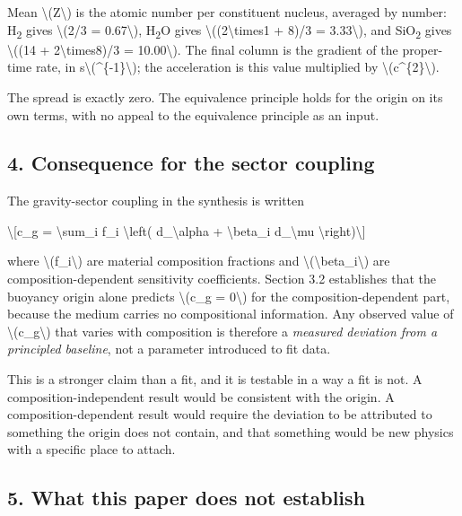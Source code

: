 \documentclass[
  10pt,
]{article}
\begin{document}
Mean \textbackslash(Z\textbackslash) is the atomic number per
constituent nucleus, averaged by number: H\textsubscript{2} gives
\textbackslash(2/3 = 0.67\textbackslash), H\textsubscript{2}O gives
\textbackslash((2\textbackslash times1 + 8)/3 = 3.33\textbackslash), and
SiO\textsubscript{2} gives \textbackslash((14 +
2\textbackslash times8)/3 = 10.00\textbackslash). The final column is
the gradient of the proper-time rate, in
s\textbackslash(\^{}\{-1\}\textbackslash); the acceleration is this
value multiplied by \textbackslash(c\^{}\{2\}\textbackslash).

The spread is exactly zero. The equivalence principle holds for the
origin on its own terms, with no appeal to the equivalence principle as
an input.

\hypertarget{consequence-for-the-sector-coupling}{%
\subsection{4. Consequence for the sector
coupling}\label{consequence-for-the-sector-coupling}}

The gravity-sector coupling in the synthesis is written

\textbackslash{[}c\_g = \textbackslash sum\_i f\_i \textbackslash left(
d\_\textbackslash alpha + \textbackslash beta\_i d\_\textbackslash mu
\textbackslash right)\textbackslash{]}

where \textbackslash(f\_i\textbackslash) are material composition
fractions and \textbackslash(\textbackslash beta\_i\textbackslash) are
composition-dependent sensitivity coefficients. Section 3.2 establishes
that the buoyancy origin alone predicts \textbackslash(c\_g =
0\textbackslash) for the composition-dependent part, because the medium
carries no compositional information. Any observed value of
\textbackslash(c\_g\textbackslash) that varies with composition is
therefore a \emph{measured deviation from a principled baseline}, not a
parameter introduced to fit data.

This is a stronger claim than a fit, and it is testable in a way a fit
is not. A composition-independent result would be consistent with the
origin. A composition-dependent result would require the deviation to be
attributed to something the origin does not contain, and that something
would be new physics with a specific place to attach.

\hypertarget{what-this-paper-does-not-establish}{%
\subsection{5. What this paper does not
establish}\label{what-this-paper-does-not-establish}}
\end{document}
